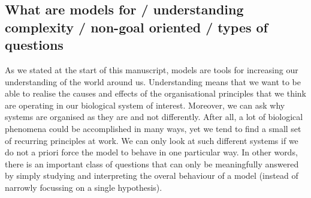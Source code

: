 \subsection{What are models for / understanding complexity / non-goal oriented / types of questions}

As we stated at the start of this manuscript, models are tools for increasing our understanding of the world around us. Understanding means that we want to be able to realise the causes and effects of the organisational principles that we think are operating in our biological system of interest. Moreover, we can ask why systems are organised as they are and not differently. After all, a lot of biological phenomena could be accomplished in many ways, yet we tend to find a small set of recurring principles at work. We can only look at such different systems if we do not a priori force the model to behave in one particular way. In other words, there is an important class of questions that can only be meaningfully answered by simply studying and interpreting the overal behaviour of a model (instead of narrowly focussing on a single hypothesis).
  
  